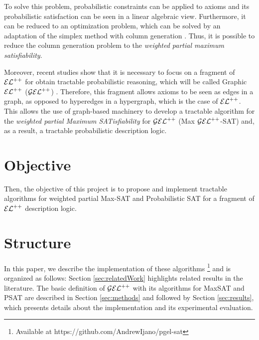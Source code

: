 To solve this problem, probabilistic constraints can be applied to axioms and its probabilistic satisfaction can be seen in a linear algebraic view. Furthermore, it can be reduced to an optimization problem, which can be solved by an adaptation of the simplex method with column generation \citep{Fin2019b}. Thus, it is possible to reduce the column generation problem to the \emph{weighted partial maximum satisfiability}.

Moreover, recent studies show that it is necessary to focus on a fragment of $\mathcal{EL}^{++}$ for obtain tractable probabilistic reasoning, which will be called {Graphic} $\mathcal{EL}^{++}$ ($\mathcal{GEL}^{++}$) \citep{Fin2020}. Therefore, this fragment allows axioms to be seen as edges in a graph, as opposed to hyperedges in a hypergraph, which is the case of $\mathcal{EL}^{++}$. This allows the use of graph-based machinery to develop a tractable algorithm for the \emph{weighted partial Maximum SATisfiability} for $\mathcal{GEL}^{++}$ (Max $\mathcal{GEL}^{++}$-SAT) and, as a result, a tractable probabilistic description logic.

\section{Objective}
Then, the objective of this project is to propose and implement tractable algorithms for weighted partial Max-SAT and Probabilistic SAT for a fragment of $\mathcal{EL}^{++}$ description logic.

\section{Structure}
In this paper, we describe the implementation of these algorithms \footnote{Available at https://github.com/AndrewIjano/pgel-sat} and is organized as follows: Section \ref{sec:relatedWork} highlights related results in the literature. The basic definition of $\mathcal{GEL}^{++}$ with its algorithms for MaxSAT and PSAT are described in Section \ref{sec:methods} and followed by Section \ref{sec:results}, which presents details about the implementation and its experimental evaluation.
